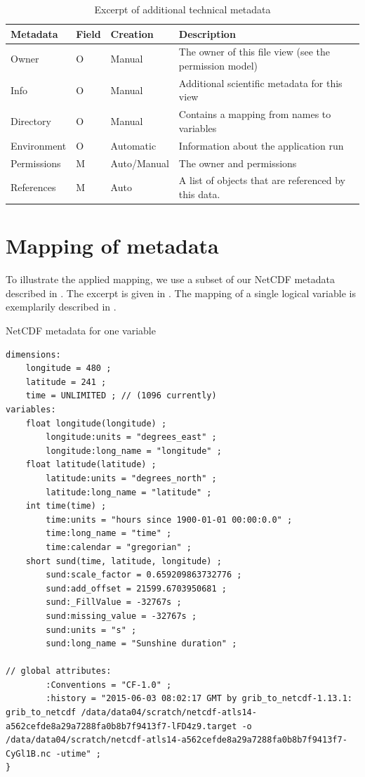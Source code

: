 \begin{table}
	\begin{subtable}[t]{\textwidth}
		\begin{tabular}{llll}
			Metadata & Field & Creation & Description\\
			\hline
			Owner    & O     & Manual   & The owner of this file view (see the permission model)\\
			Info     & O     & Manual   & Additional scientific metadata for this view\\
			Directory & O    & Manual   & Contains a mapping from names to variables\\
			Environment & O  & Automatic & Information about the application run\\
			Permissions & M & Auto/Manual & The owner and permissions \\
			References  & M & Auto & A list of objects that are referenced by this data.
		\end{tabular}
		\caption{For a container}
	\end{subtable}
	\caption{Excerpt of additional technical metadata}
	\label{tbl:additionalTechnicalMetadata}
\end{table}




\section{Mapping of metadata}

To illustrate the applied mapping, we use a subset of our NetCDF metadata described in .
The excerpt is given in .
The mapping of a single logical variable is exemplarily described in .


\begin{tcbcode}[label={lst:NetCDF-data-map}]{NetCDF metadata for one variable}
\begin{lstlisting}[upquote=true]
dimensions:
	longitude = 480 ;
	latitude = 241 ;
	time = UNLIMITED ; // (1096 currently)
variables:
	float longitude(longitude) ;
		longitude:units = "degrees_east" ;
		longitude:long_name = "longitude" ;
	float latitude(latitude) ;
		latitude:units = "degrees_north" ;
		latitude:long_name = "latitude" ;
	int time(time) ;
		time:units = "hours since 1900-01-01 00:00:0.0" ;
		time:long_name = "time" ;
		time:calendar = "gregorian" ;
	short sund(time, latitude, longitude) ;
		sund:scale_factor = 0.659209863732776 ;
		sund:add_offset = 21599.6703950681 ;
		sund:_FillValue = -32767s ;
		sund:missing_value = -32767s ;
		sund:units = "s" ;
		sund:long_name = "Sunshine duration" ;

// global attributes:
		:Conventions = "CF-1.0" ;
		:history = "2015-06-03 08:02:17 GMT by grib_to_netcdf-1.13.1: grib_to_netcdf /data/data04/scratch/netcdf-atls14-a562cefde8a29a7288fa0b8b7f9413f7-lFD4z9.target -o /data/data04/scratch/netcdf-atls14-a562cefde8a29a7288fa0b8b7f9413f7-CyGl1B.nc -utime" ;
}
\end{lstlisting}
\end{tcbcode}

